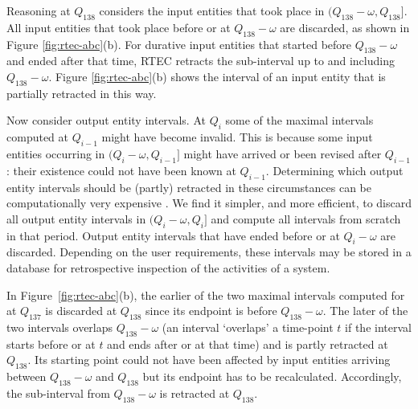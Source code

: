 Reasoning at $Q_{138}$ considers the input entities that took place in $(Q_{138}{-}\omega, Q_{138}]$. All input entities that took place before or at $Q_{138}{-}\omega$ are discarded, as shown in Figure \ref{fig:rtec-abc}(b). For durative input entities that started before $Q_{138}{-}\omega$ and ended after that time, RTEC retracts the sub-interval up to and including $Q_{138}{-}\omega$. Figure \ref{fig:rtec-abc}(b) shows the interval of an input entity that is partially retracted in this way. 

Now consider output entity intervals. At $Q_i$ some of the maximal intervals computed at $Q_{i-1}$ might have become invalid. This is because some input entities occurring in $(Q_i{-}\omega, Q_{i-1}]$ might have arrived or been revised after $Q_{i-1}$: their existence could not have been known at $Q_{i-1}$. Determining which output entity intervals should be (partly) retracted in these circumstances can be computationally very expensive \cite{DBLP:journals/tkde/ArtikisSP15}. We find it simpler, and more efficient, to discard all output entity intervals in $(Q_i{-}\omega, Q_i]$ and compute all intervals from scratch in that period. Output entity intervals that have ended before or at $Q_i{-}\omega$ are discarded. Depending on the user requirements, these intervals may be stored in a database for retrospective inspection of the activities of a system.

In Figure~\ref{fig:rtec-abc}(b), the earlier of the two maximal intervals computed for  at $Q_{137}$ is discarded at $Q_{138}$ since its endpoint is before $Q_{138}{-}\omega$. The later of the two intervals overlaps $Q_{138}{-}\omega$ (an interval `overlaps' a time-point $t$ if the interval starts before or at $t$ and ends after or at that time) and is partly retracted at $Q_{138}$. Its starting point could not have been affected by input entities arriving between $Q_{138}{-}\omega$ and $Q_{138}$ but its endpoint has to be recalculated. Accordingly, the sub-interval from $Q_{138}{-}\omega$ is retracted at $Q_{138}$.

